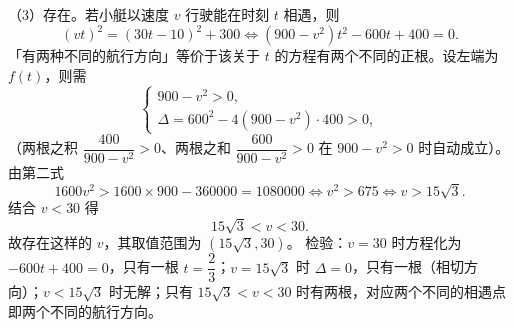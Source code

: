 \begin{answer}
（3）存在。若小艇以速度 $v$ 行驶能在时刻 $t$ 相遇，则
\nopagebreak[4]
\[(vt)^2=(30t-10)^2+300\iff\left(900-v^2\right)t^2-600t+400=0.\]
「有两种不同的航行方向」等价于该关于 $t$ 的方程有两个不同的正根。设左端为 $f(t)$，则需
\nopagebreak[4]
\[\begin{cases}900-v^2>0,\\\Delta=600^2-4\left(900-v^2\right)\cdot400>0,\end{cases}\]
（两根之积 $\dfrac{400}{900-v^2}>0$、两根之和 $\dfrac{600}{900-v^2}>0$ 在 $900-v^2>0$ 时自动成立）。由第二式
\nopagebreak[4]
\[1600v^2>1600\times900-360000=1080000\iff v^2>675\iff v>15\sqrt3.\]
结合 $v<30$ 得
\nopagebreak[4]
\[15\sqrt3<v<30.\]
故存在这样的 $v$，其取值范围为 $\left(15\sqrt3,30\right)$。
检验：$v=30$ 时方程化为 $-600t+400=0$，只有一根 $t=\dfrac23$；$v=15\sqrt3$ 时 $\Delta=0$，只有一根（相切方向）；$v<15\sqrt3$ 时无解；只有 $15\sqrt3<v<30$ 时有两根，对应两个不同的相遇点即两个不同的航行方向。


\end{answer}
